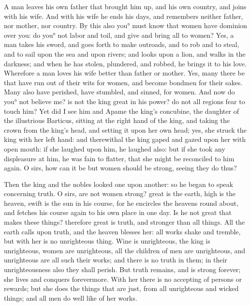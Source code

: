 {A man leaves his own father that brought him up, and his own country, and joins with his wife.
And with his wife he ends his days, and remembers neither father, nor mother, nor country.
By this also you° must know that women have dominion over you: do you° not labor and toil, and give and bring all to women?
Yes, a man takes his sword, and goes forth to make outroads, and to rob and to steal, and to sail upon the sea and upon rivers;
and looks upon a lion, and walks in the darkness; and when he has stolen, plundered, and robbed, he brings it to his love.
Wherefore a man loves his wife better than father or mother.
Yes, many there be that have run out of their wits for women, and become bondmen for their sakes.
Many also have perished, have stumbled, and sinned, for women.
And now do you° not believe me? is not the king great in his power? do not all regions fear to touch him?
Yet did I see him and Apame the king’s concubine, the daughter of the illustrious Barticus, sitting at the right hand of the king,
and taking the crown from the king’s head, and setting it upon her own head; yes, she struck the king with her left hand:
and therewithal the king gaped and gazed upon her with open mouth: if she laughed upon him, he laughed also: but if she took any displeasure at him, he was fain to flatter, that she might be reconciled to him again.
O sirs, how can it be but women should be strong, seeing they do thus?
\par }{\PP {}Then the king and the nobles looked one upon another: so he began to speak concerning truth.
O sirs, are not women strong? great is the earth, high is the heaven, swift is the sun in his course, for he encircles the heavens round about, and fetches his course again to his own place in one day.
Is he not great that makes these things? therefore great is truth, and stronger than all things.
All the earth calls upon truth, and the heaven blesses her: all works shake and tremble, but with
 her is no unrighteous thing.
Wine is unrighteous, the king is unrighteous, women are unrighteous, all the children of men are unrighteous, and unrighteous are all such their works; and there is no truth in them; in their unrighteousness also they shall perish.
But truth remains, and is strong forever; she lives and conquers forevermore.
With her there is no accepting of persons or rewards; but she does the things that are just,
{} from all unrighteous and wicked things; and all men do well like of her works.
}
